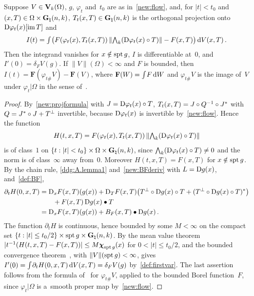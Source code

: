 \documentclass[a4paper,twoside,leqno]{article}
\newcommand{\Gk}{\pgrass{\adim}{\vdim}}        %
\newcommand{\MS}{\textbf{[MS path]}}            %
\begin{document}
\begin{lemma}[{\cite[Lemma~A.2]{DePhilippis2018}; \MS}]
    \label{ddg:A.2}
    Suppose $V \in \mathbf{V}_{k}(\Omega)$, $g$, $\varphi_t$ and~$t_0$ are as in~\ref{new:flow}, and,
    for $|t| < t_0$ and $(x,T) \in \Omega \times \Gk$, $T_t(x,T) \in \Gk$ is the orthogonal
    projection onto $\mathrm{D} \varphi_t(x)[\operatorname{im} T]$ and
    \begin{displaymath}
        I(t) = {\textstyle\int_{}^{}} \bigl( F(\varphi_t(x), T_t(x,T)) \, \|{\textstyle\boldsymbol{\bigwedge}}_{{k}}(\mathrm{D} \varphi_t(x)
        \circ T)\| - F(x,T) \bigr) \,\mathrm{d} V(x,T) \,.
    \end{displaymath}
    Then the integrand vanishes for $x \notin \operatorname{spt} g$, $I$ is differentiable at~$0$, and $I'(0) =
    \delta_F V(g)$. If $\|V\|(\Omega) < \infty$ and $F$ is bounded, then $I(t) = \mathbf{F}(\varphi_{t\#}
    V) - \mathbf{F}(V)$, where $\mathbf{F}(W) = {\textstyle\int_{}^{}} F \,\mathrm{d} W$ and $\varphi_{t\#} V$ is the
    image of~$V$ under $\varphi_t | \Omega$ in the sense of~\cite[3.2]{Allard1972}.
\end{lemma}

\begin{proof}
    By~\ref{new:projformula} with $J = \mathrm{D} \varphi_t(x) \circ T$, $T_t(x,T) = J \circ Q^{-1} \circ
    J^{*}$ with $Q = J^{*} \circ J + T^\perp$ invertible, because $\mathrm{D} \varphi_t(x)$
    is invertible by~\ref{new:flow}. Hence the function
    \begin{displaymath}
        H(t,x,T) = F(\varphi_t(x), T_t(x,T)) \, \|{\textstyle\boldsymbol{\bigwedge}}_{{k}}(\mathrm{D} \varphi_t(x) \circ T)\|
    \end{displaymath}
    is of class~$1$ on $\{ t : |t| < t_0 \} \times \Omega \times \Gk$, since ${\textstyle\boldsymbol{\bigwedge}}_{{k}}(\mathrm{D}
    \varphi_t(x) \circ T) \ne 0$ and the norm is of class~$\infty$ away from~$0$. Moreover
    $H(t,x,T) = F(x,T)$ for $x \notin \operatorname{spt} g$. By the chain rule, \ref{ddg:A.lemma1}
    and~\ref{new:BFderiv} with $L = \mathrm{D} g(x)$, and~\ref{def:BF},
    \begin{displaymath}
        \begin{aligned}
            \partial_t H(0,x,T) & = \mathrm{D}_x F(x,T)(g(x)) + \mathrm{D}_T F(x,T)\bigl(T^\perp \circ \mathrm{D} g(x)
            \circ T + (T^\perp \circ \mathrm{D} g(x) \circ T)^{*}\bigr) \\
            & \qquad + F(x,T) \, \mathrm{D} g(x) \bullet T \\
            & = \mathrm{D}_x F(x,T)(g(x)) + B_F(x,T) \bullet \mathrm{D} g(x) \,.
        \end{aligned}
    \end{displaymath}
    The function $\partial_t H$ is continuous, hence bounded by some $M < \infty$ on the compact
    set $\{ t : |t| \le t_0/2 \} \times \spt g \times \Gk$. By the mean value theorem $|t^{-1}(H(t,x,T)
    - F(x,T))| \le M \boldsymbol{\chi}_{\operatorname{spt} g}(x)$ for $0 < |t| \le t_0/2$, and the bounded convergence
    theorem~\cite[2.4.9]{Federer1969}, with $\|V\|(\operatorname{spt} g) < \infty$, gives $I'(0) = {\textstyle\int_{}^{}}
    \partial_t H(0,x,T) \,\mathrm{d} V(x,T) = \delta_F V(g)$ by~\ref{def:firstvar}. The last assertion
    follows from the formula of~\cite[3.2(1)]{Allard1972} for $\varphi_{t\#} V$, applied to the
    bounded Borel function~$F$, since $\varphi_t | \Omega$ is a~smooth proper map
    by~\ref{new:flow}.
\end{proof}
\end{document}

